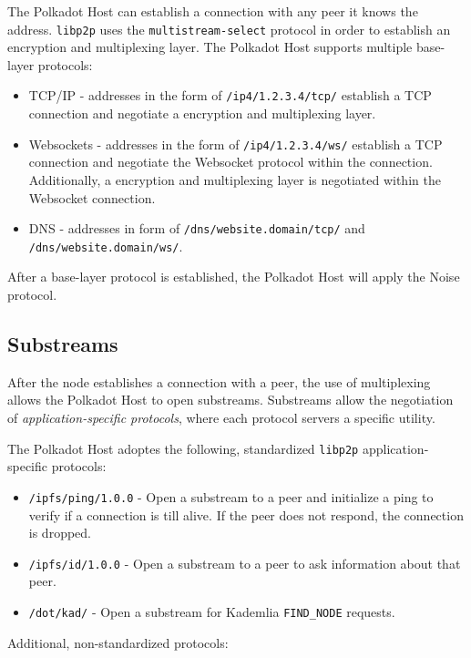 \documentclass{book}
\begin{document}
The Polkadot Host can establish a connection with any peer it knows the address.
\verb|libp2p| uses the \verb|multistream-select| protocol in order to establish
an encryption and multiplexing layer. The Polkadot Host supports multiple
base-layer protocols:

\begin{itemize}
    \item TCP/IP - addresses in the form of \verb|/ip4/1.2.3.4/tcp/| establish a
    TCP connection and negotiate a encryption and multiplexing layer.
    \item Websockets - addresses in the form of \verb|/ip4/1.2.3.4/ws/|
    establish a TCP connection and negotiate the Websocket protocol within the
    connection. Additionally, a encryption and multiplexing layer is negotiated
    within the Websocket connection.
    \item DNS - addresses in form of \verb|/dns/website.domain/tcp/| and
    \verb|/dns/website.domain/ws/|.
\end{itemize}

After a base-layer protocol is established, the Polkadot Host will apply the
Noise protocol.

\subsection{Substreams}

After the node establishes a connection with a peer, the use of multiplexing
allows the Polkadot Host to open substreams. Substreams allow the negotiation of
\textit{application-specific protocols}, where each protocol servers a specific
utility.

The Polkadot Host adoptes the following, standardized \verb|libp2p|
application-specific protocols:

\begin{itemize}
    \item \verb|/ipfs/ping/1.0.0| - Open a substream to a peer and initialize a
    ping to verify if a connection is till alive. If the peer does not respond,
    the connection is dropped.
    \item \verb|/ipfs/id/1.0.0| - Open a substream to a peer to ask information
    about that peer.
    \item \verb|/dot/kad/| - Open a substream for Kademlia
    \verb|FIND_NODE| requests.
\end{itemize}

Additional, non-standardized protocols:
\end{document}
